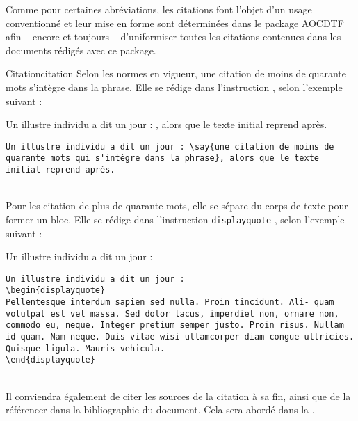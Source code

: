 \documentclass[a4paper, 11pt, twoside, fleqn]{memoir}
\begin{document}
Comme pour certaines abréviations, les citations font l'objet d'un usage conventionné et leur mise en forme sont déterminées dans le package AOCDTF afin -- encore et toujours -- d'uniformiser toutes les citations contenues dans les documents rédigés avec ce package.

\begin{exemple}{Citation}{citation}
Selon les normes en vigueur, une citation de moins de quarante mots s'intègre dans la phrase. Elle se rédige dans l'instruction \texttt{}, selon l'exemple suivant :\\

\begin{minipage}[t]{0.49\linewidth}
Un illustre individu a dit un jour : , alors que le texte initial reprend après.
\end{minipage}
\hfill
\begin{minipage}[t]{0.49\linewidth}
\begin{verbatim}
Un illustre individu a dit un jour : \say{une citation de moins de quarante mots qui s'intègre dans la phrase}, alors que le texte initial reprend après.
\end{verbatim}
\end{minipage}\\

Pour les citation de plus de quarante mots, elle se sépare du corps de texte pour former un bloc. Elle se rédige dans l'instruction \texttt{displayquote} , selon l'exemple suivant :\\

\begin{minipage}[t]{0.49\linewidth}
Un illustre individu a dit un jour : 
\begin{displayquote}
\lipsum[75]
\end{displayquote}

\end{minipage}
\hfill
\begin{minipage}[t]{0.49\linewidth}
\begin{verbatim}
Un illustre individu a dit un jour : 
\begin{displayquote}
Pellentesque interdum sapien sed nulla. Proin tincidunt. Ali- quam volutpat est vel massa. Sed dolor lacus, imperdiet non, ornare non, commodo eu, neque. Integer pretium semper justo. Proin risus. Nullam id quam. Nam neque. Duis vitae wisi ullamcorper diam congue ultricies. Quisque ligula. Mauris vehicula.
\end{displayquote}
\end{verbatim}
\end{minipage}\\

Il conviendra également de citer les sources de la citation à sa fin, ainsi que de la référencer dans la bibliographie du document. Cela sera abordé dans la . 

\end{exemple}
\end{document}
